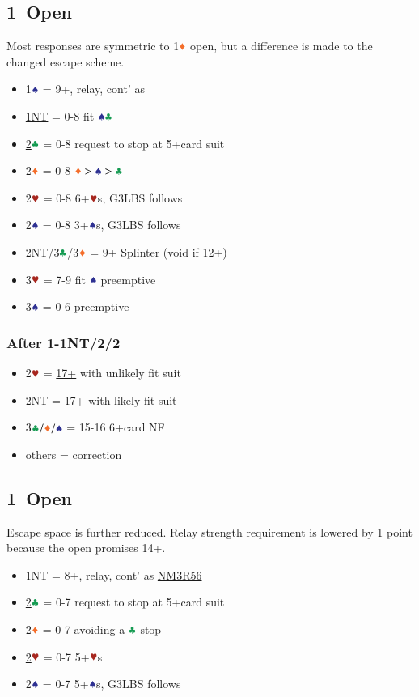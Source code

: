 \documentclass{article}
\begin{document}
\begin{multicols}{2}
\begin{CJK*}{UTF8}{gt}
\subsection{1\HHH\ Open}\label{sec:1h}
Most responses are symmetric to 1$\ddd$ open, but a difference is made to the changed escape scheme.
\begin{itemize}
    \item 1$\sss$ = 9+, relay, cont' as 
    \item \hyperref[sec:1h-escape]{1NT} = 0-8 fit $\sss\ccc$
    \item \hyperref[sec:1h-escape]{2$\ccc$} = 0-8 request to stop at 5+card suit
    \item \hyperref[sec:1h-escape]{2$\ddd$} = 0-8 $\ddd>\sss>\ccc$
    \item 2$\hhh$ = 0-8 6+$\hhh$s, G3LBS follows
    \item 2$\sss$ = 0-8 3+$\sss$s, G3LBS follows
    \item 2NT/3$\ccc$/3$\ddd$ = 9+ Splinter (void if 12+)
    \item 3$\hhh$ = 7-9 fit $\sss$ preemptive
    \item 3$\sss$ = 0-6 preemptive
\end{itemize}

\subsubsection{After 1\HHH-1NT/2\CCC/2\DDD}\label{sec:1h-escape}
\begin{itemize}
    \item 2$\hhh$ = \hyperref[sec:2suit-strong-rebid]{17+} with unlikely fit suit
    \item 2NT = \hyperref[sec:2suit-strong-rebid]{17+} with likely fit suit
    \item 3$\ccc/\ddd/\sss$ = 15-16 6+card NF
    \item others = correction
\end{itemize}

\subsection{1\SSS\ Open}\label{sec:1s}
Escape space is further reduced. Relay strength requirement is lowered by 1 point because the open promises 14+.
\begin{itemize}
    \item 1NT = 8+, relay, cont' as \hyperref[sec:nlm3r56]{NM3R56}
    \item \hyperref[sec:1s-escape]{2$\ccc$} = 0-7 request to stop at 5+card suit
    \item \hyperref[sec:1s-escape]{2$\ddd$} = 0-7 avoiding a $\ccc$ stop
    \item \hyperref[sec:1s-escape]{2$\hhh$} = 0-7 5+$\hhh$s
    \item 2$\sss$ = 0-7 5+$\sss$s, G3LBS follows
\end{itemize}


\end{CJK*}
\end{multicols}
\end{document}
